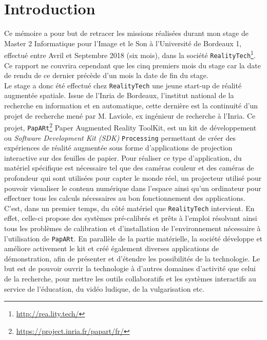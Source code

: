 \chapter{Introduction}
\label{chap:intro}

Ce mémoire a pour but de retracer les missions réalisées durant mon stage de Master 2 Informatique pour l'Image et le Son à l'Université de Bordeaux 1, effectué entre Avril et Septembre 2018 (six mois), dans la société \texttt{RealityTech}\footnote{\href{http://rea.lity.tech/}{http://rea.lity.tech/}}. Ce rapport ne couvrira cependant que les cinq premiers mois du stage car la date de rendu de ce dernier précède d'un mois la date de fin du stage.\\

Le stage a donc été effectué chez \texttt{RealityTech} une jeune start-up de réalité augmentée spatiale. Issue de l'Inria de Bordeaux, l'institut national de la recherche en information et en automatique, cette dernière est la continuité d'un projet de recherche mené par M. Laviole, ex ingénieur de recherche à l'Inria. Ce projet, \texttt{PapARt}\footnote{\href{https://project.inria.fr/papart/fr/}{https://project.inria.fr/papart/fr/}} Paper Augmented Reality ToolKit, est un kit de développement ou \emph{Software Development Kit (SDK)} \texttt{Processing} permettant de créer des expériences de réalité augmentée sous forme d'applications de projection interactive sur des feuilles de papier. Pour réaliser ce type d'application, du matériel spécifique est nécessaire tel que des caméras couleur et des caméras de profondeur qui sont utilisées pour capter le monde réel, un projecteur utilisé pour pouvoir visualiser le contenu numérique dans l'espace ainsi qu'un ordinateur pour effectuer tous les calculs nécessaires au bon fonctionnement des applications.\\

C'est, dans un premier temps, du côté matériel que \texttt{RealityTech} intervient. En effet, celle-ci propose des systèmes pré-calibrés et prêts à l'emploi résolvant ainsi tous les problèmes de calibration et d'installation de l'environnement nécessaire à l'utilisation de \texttt{PapARt}. En parallèle de la partie matérielle, la société développe et améliore activement le kit et créé également diverses applications de démonstration, afin de présenter et d'étendre les possibilités de la technologie. Le but est de pouvoir ouvrir la technologie à d'autres domaines d'activité que celui de la recherche, pour mettre les outils collaboratifs et les systèmes interactifs au service de l'éducation, du vidéo ludique, de la vulgarisation etc.

